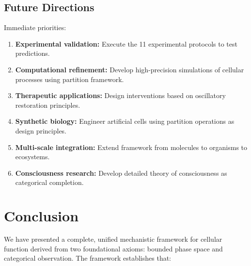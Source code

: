 \documentclass[12pt,a4paper]{article}
\begin{document}
\subsection{Future Directions}

Immediate priorities:

\begin{enumerate}
\item \textbf{Experimental validation:} Execute the 11 experimental protocols to test predictions.

\item \textbf{Computational refinement:} Develop high-precision simulations of cellular processes using partition framework.

\item \textbf{Therapeutic applications:} Design interventions based on oscillatory restoration principles.

\item \textbf{Synthetic biology:} Engineer artificial cells using partition operations as design principles.

\item \textbf{Multi-scale integration:} Extend framework from molecules to organisms to ecosystems.

\item \textbf{Consciousness research:} Develop detailed theory of consciousness as categorical completion.
\end{enumerate}

\section{Conclusion}

We have presented a complete, unified mechanistic framework for cellular function derived from two foundational axioms: bounded phase space and categorical observation. The framework establishes that:
\end{document}
